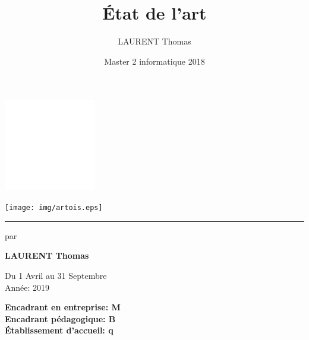 \documentclass[french, 12pt]{report}
\title{État de l'art}
\author{LAURENT Thomas}
\date{Master 2 informatique 2018}
\newcommand{\sepline}{\textcolor{gray}{\noindent\rule{14cm}{0.1pt}}}
\begin{document}
\begin{titlepage}

\begin{multicols}{2}
\begin{flushleft}
    \includegraphics[width=4cm]{img/entreprise.jpg}
\end{flushleft}
\begin{flushright}
    \texttt{[image: img/artois.eps]}
\end{flushright}
\end{multicols}

\begin{center}
 
	   \sepline
       \vspace{3cm}
 
       \vspace{3cm}
	   
	   \vspace{1.5cm}
	   par 
       \vspace{1.5cm}
 
       \textbf{LAURENT Thomas}
 
       \vfill
 
       \vspace{0.6cm}
 
       Du 1 Avril au 31 Septembre\\
       Année: 2019
       
       \vspace{0.8cm}
       
       \textbf{Encadrant en entreprise: M\\}
       \textbf{Encadrant pédagogique: B\\}
       \textbf{Établissement d’accueil: q\\}
 
   \end{center}
\end{titlepage}
\pagebreak
\end{document}
